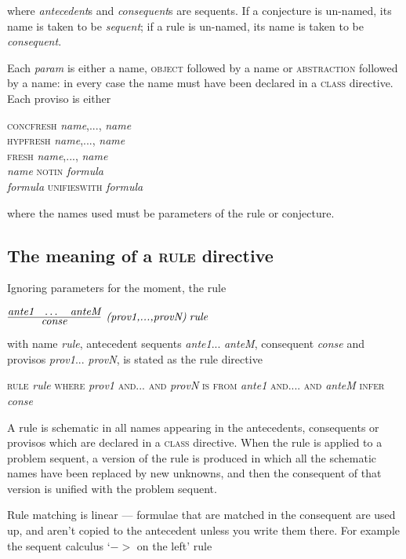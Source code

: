 where \textit{antecedent}s and \textit{consequent}s are sequents. If a conjecture is un-named, its name is taken to be \textit{sequent}; if a rule is un-named, its name is taken to be \textit{consequent}.

Each \textit{param} is either a name, \textsc{object} followed by a name or \textsc{abstraction} followed by a name: in every case the name must have been declared in a \textsc{class} directive. Each proviso is either

\textsc{concfresh} \textit{name},..., \textit{name}\\
\textsc{hypfresh} \textit{name},..., \textit{name}\\
\textsc{fresh} \textit{name},..., \textit{name}\\
\textit{name} \textsc{notin} \textit{formula}\\
\textit{formula} \textsc{unifieswith} \textit{formula}

where the names used must be parameters of the rule or conjecture.

\subsection{The meaning of a \textsc{rule} directive}

Ignoring parameters for the moment, the rule

$\infer[\textit{(prov1,...,provN)\;rule}]
       {\textit{conse}}
       {\textit{ante1} & \dots & \textit{anteM}}$

with name \textit{rule}, antecedent sequents \textit{ante1}... \textit{anteM}, consequent \textit{conse} and provisos \textit{prov1}... \textit{provN}, is stated as the rule directive

\textsc{rule} \textit{rule} \textsc{where} \textit{prov1} \textsc{and... and} \textit{provN} \textsc{is from} \textit{ante1} \textsc{and.... and} \textit{anteM} \textsc{infer} \textit{conse}

A rule is schematic in all names appearing in the antecedents, consequents or provisos which are declared in a \textsc{class} directive. When the rule is applied to a problem sequent, a version of the rule is produced in which all the schematic names have been replaced by new unknowns, and then the consequent of that version is unified with the problem sequent.

Rule matching is linear --- formulae that are matched in the consequent are used up, and aren't copied to the antecedent unless you write them there. For example the sequent calculus `$->$ on the left' rule


